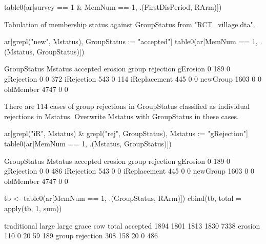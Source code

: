 \begin{Schunk}
\begin{Sinput}
table0(ar[survey == 1 & MemNum == 1,  .(FirstDisPeriod, RArm)])
\end{Sinput}
\end{Schunk}
Tabulation of membership status against \textsf{GroupStatus} from \textsf{"RCT\_village.dta"}.
\begin{Schunk}
\begin{Sinput}
ar[grepl("new", Mstatus), GroupStatus := "accepted"]
table0(ar[MemNum == 1, .(Mstatus, GroupStatus)])
\end{Sinput}
\begin{Soutput}
              GroupStatus
Mstatus        accepted erosion group rejection
  gErosion            0     189               0
  gRejection          0       0             372
  iRejection        543       0             114
  iReplacement      445       0               0
  newGroup         1603       0               0
  oldMember        4747       0               0
\end{Soutput}
\end{Schunk}
There are 114 cases of group rejections in \textsf{GroupStatus} classified as individual rejections in \textsf{Mstatus}. Overwrite \textsf{Mstatus} with \textsf{GroupStatus} in these cases.
\begin{Schunk}
\begin{Sinput}
ar[grepl("iR", Mstatus) & grepl("rej", GroupStatus), Mstatus := "gRejection"]
table0(ar[MemNum == 1, .(Mstatus, GroupStatus)])
\end{Sinput}
\begin{Soutput}
              GroupStatus
Mstatus        accepted erosion group rejection
  gErosion            0     189               0
  gRejection          0       0             486
  iRejection        543       0               0
  iReplacement      445       0               0
  newGroup         1603       0               0
  oldMember        4747       0               0
\end{Soutput}
\begin{Sinput}
tb <- table0(ar[MemNum == 1, .(GroupStatus, RArm)])
cbind(tb, total = apply(tb, 1, sum))
\end{Sinput}
\begin{Soutput}
                traditional large large grace  cow total
accepted               1894  1801        1813 1830  7338
erosion                 110     0          20   59   189
group rejection         308   158          20    0   486
\end{Soutput}
\end{Schunk}
